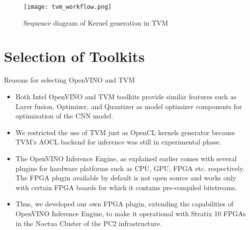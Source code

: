 \begin{figure}[h!]
    \centering
    \texttt{[image: tvm\_workflow.png]}
    \caption{Sequence diagram of Kernel generation in TVM}
\end{figure}
\pagebreak
 
 \section{Selection of Toolkits}
Reasons for selecting OpenVINO and TVM
 \begin{itemize}
 \item Both Intel OpenVINO and TVM toolkits provide similar features such as Layer fusion, Optimizer, and Quantizer as model optimizer components for optimization of the CNN model. 
 \item We restricted the use of TVM just as OpenCL kernels generator because TVM's AOCL backend for inference was still in experimental phase.
 \item The OpenVINO Inference Engine, as explained earlier comes with several plugins for hardware platforms such as CPU, GPU, FPGA etc. respectively. The FPGA plugin available by default is not open source and works only with certain FPGA boards for which it contains pre-compiled bitstreams. 
 \item Thus, we developed our own FPGA plugin, extending the capabilities of OpenVINO Inference Engine, to make it operational with Stratix 10 FPGAs in the Noctua Cluster of the PC2 infrastructure. 

 \end{itemize}